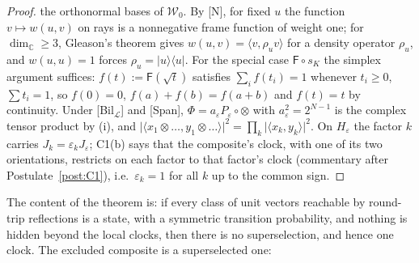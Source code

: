 \documentclass[aps,pra,onecolumn,superscriptaddress,nofootinbib,10pt]{revtex4-2}
\theoremstyle{definition}
\theoremstyle{remark}
\newcommand{\C}{\mathbb{C}}
\newcommand{\cL}{\mathcal{L}}
\newcommand{\ip}[2]{\langle #1,#2\rangle}
\begin{document}
\begin{proof}
the orthonormal bases of $\mathcal W_0$.  By [N], for fixed $u$ the function $v\mapsto w(u,v)$ on rays is a nonnegative frame
function of weight one; for $\dim_\C\ge3$, Gleason's theorem \cite{Gleason57} gives $w(u,v)=\ip{v}{\rho_uv}$ for a
density operator $\rho_u$, and $w(u,u)=1$ forces $\rho_u=\lvert u\rangle\langle u\rvert$.  For the special case $\mathsf F\circ s_K$ the
simplex argument suffices: $f(t):=\mathsf F(\sqrt t)$ satisfies $\sum_if(t_i)=1$ whenever $t_i\ge0$, $\sum t_i=1$, so $f(0)=0$,
$f(a)+f(b)=f(a+b)$ and $f(t)=t$ by continuity.  Under [Bil$_\cL$] and [Span], $\Phi=a_\varepsilon P_\varepsilon\circ\otimes$ with
$a_\varepsilon^2=2^{N-1}$ is the complex tensor product by (i), and $\lvert\ip{x_1\otimes\dots}{y_1\otimes\dots}\rvert^2=\prod_k\lvert\ip{x_k}{y_k}\rvert^2$.
On $H_\varepsilon$ the factor $k$ carries $J_k=\varepsilon_kJ_\varepsilon$; C1(b) says that the composite's clock, with one of its two
orientations, restricts on each factor to that factor's clock (commentary after
Postulate~\ref{post:C1}), i.e.\ $\varepsilon_k=1$ for all $k$ up to the common sign.
\end{proof}

The content of the theorem is: if every class of unit vectors reachable by round-trip reflections is a
state, with a symmetric transition probability, and nothing is hidden beyond the local clocks, then
there is no superselection, and hence one clock.  The excluded composite is a superselected one:
\end{document}
